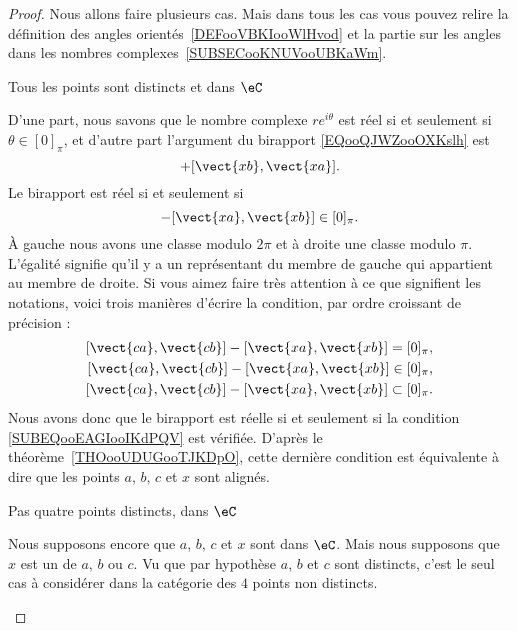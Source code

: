 \begin{proof}
	Nous allons faire plusieurs cas. Mais dans tous les cas vous pouvez relire la définition des angles orientés~\ref{DEFooVBKIooWlHvod} et la partie sur les angles dans les nombres complexes~\ref{SUBSECooKNUVooUBKaWm}.
	\begin{subproof}
		\item[Tous les points sont distincts et dans \( \eC\)]

		D'une part, nous savons que le nombre complexe \( r e^{i\theta}\) est réel si et seulement si \( \theta\in[0]_{\pi}\), et d'autre part l'argument du birapport \eqref{EQooQJWZooOXKslh} est
		\begin{equation}
			[\vect{ ca },\vect{ cb }]+[\vect{ xb },\vect{ xa }].
		\end{equation}
		Le birapport est réel si et seulement si
		\begin{equation}
			[\vect{ ca },\vect{ cb }]-[\vect{ xa },\vect{ xb }]\in[0]_{\pi}.
		\end{equation}
		À gauche nous avons une classe modulo \( 2\pi\) et à droite une classe modulo \( \pi\). L'égalité signifie qu'il y a un représentant du membre de gauche qui appartient au membre de droite. Si vous aimez faire très attention à ce que signifient les notations, voici trois manières d'écrire la condition, par ordre croissant de précision :
		\begin{subequations}
			\begin{align}
				[\vect{ ca },\vect{ cb }]-[\vect{ xa },\vect{ xb }]=[0]_{\pi},   \\
				[\vect{ ca },\vect{ cb }]-[\vect{ xa },\vect{ xb }]\in[0]_{\pi}, \\
				[\vect{ ca },\vect{ cb }]-[\vect{ xa },\vect{ xb }]\subset[0]_{\pi}.        \label{SUBEQooEAGIooIKdPQV}
			\end{align}
		\end{subequations}
		Nous avons donc que le birapport est réelle si et seulement si la condition \eqref{SUBEQooEAGIooIKdPQV} est vérifiée. D'après le théorème~\ref{THOooUDUGooTJKDpO}, cette dernière condition est équivalente à dire que les points \( a\), \( b\), \( c\) et \( x\) sont alignés.

		\item[Pas quatre points distincts, dans \( \eC\)]

		Nous supposons encore que \( a\), \( b\), \( c\) et \( x\) sont dans \( \eC\). Mais nous supposons que \( x\) est un de \( a\), \( b\) ou \( c\). Vu que par hypothèse \( a\), \( b\) et \( c\) sont distincts, c'est le seul cas à considérer dans la catégorie des \( 4\) points non distincts.


\end{subproof}
\end{proof}
